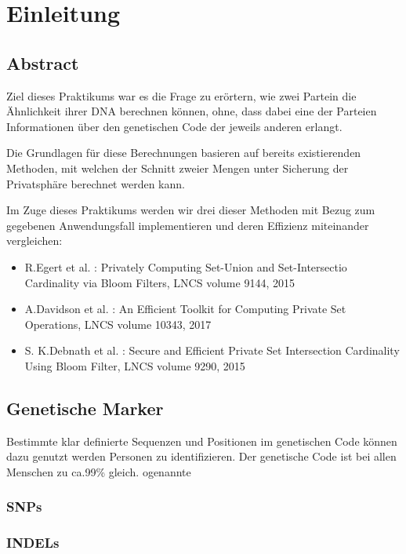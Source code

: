 \chapter{Einleitung}
\label{sec:Chapter1}


\section{ Abstract}
\label{sec:Sec1.1}

Ziel dieses Praktikums war es die Frage zu erörtern, wie zwei Partein die Ähnlichkeit ihrer DNA  berechnen können, ohne, dass dabei eine der Parteien Informationen über den genetischen Code der jeweils anderen erlangt.

Die Grundlagen für diese Berechnungen basieren auf bereits existierenden Methoden, mit welchen der Schnitt zweier Mengen unter Sicherung der Privatsphäre berechnet werden kann.

Im Zuge dieses Praktikums werden wir drei dieser Methoden mit Bezug zum gegebenen Anwendungsfall implementieren und deren Effizienz miteinander vergleichen:


\begin{itemize}
\item R.Egert et al. : Privately Computing Set-Union and Set-Intersectio Cardinality via Bloom Filters, LNCS volume 9144, 2015
\item A.Davidson et al. : An Efficient Toolkit for Computing Private Set Operations, LNCS volume 10343, 2017
\item S. K.Debnath et al. : Secure and Efficient Private Set Intersection Cardinality Using Bloom Filter, LNCS volume 9290, 2015
\end{itemize}

\section{Genetische Marker}
Bestimmte klar definierte Sequenzen und Positionen im genetischen Code können dazu genutzt werden Personen zu identifizieren.
Der genetische Code ist bei allen Menschen zu ca.99\% gleich. ogenannte 



\subsection{SNPs}


\subsection{INDELs}

